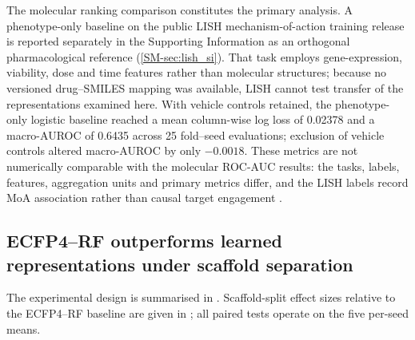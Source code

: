 \documentclass[11pt,a4paper]{article}
\begin{document}
The molecular ranking comparison constitutes the primary analysis. A phenotype-only baseline on the public LISH mechanism-of-action training release is reported separately in the Supporting Information as an orthogonal pharmacological reference (\cref{SM-sec:lish_si}). That task employs gene-expression, viability, dose and time features rather than molecular structures; because no versioned drug--SMILES mapping was available, LISH cannot test transfer of the representations examined here. With vehicle controls retained, the phenotype-only logistic baseline reached a mean column-wise log loss of \num{0.02378} and a macro-AUROC of \num{0.6435} across \num{25} fold--seed evaluations; exclusion of vehicle controls altered macro-AUROC by only $-\num{0.0018}$. These metrics are not numerically comparable with the molecular ROC-AUC results: the tasks, labels, features, aggregation units and primary metrics differ, and the LISH labels record MoA association rather than causal target engagement \citep{Trapotsi2022MoA}.

\subsection{ECFP4--RF outperforms learned representations under scaffold separation}



The experimental design is summarised in . Scaffold-split effect sizes relative to the ECFP4--RF baseline are given in ; all paired tests operate on the five per-seed means.


\end{document}

